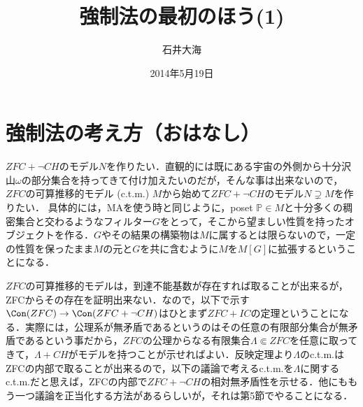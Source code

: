 \documentclass[a4j]{ltjsarticle}
\title{強制法の最初のほう(1)}
\author{石井大海}
\date{2014年5月19日}
\begin{document}
\maketitle
\section{強制法の考え方（おはなし）}
$ZFC + \neg CH$のモデル$N$を作りたい．直観的には既にある宇宙の外側から十分沢山$\omega$の部分集合を持ってきて付け加えたいのだが，そんな事は出来ないので，$ZFC$の可算推移的モデル (c.t.m.) $M$から始めて$ZFC+\neg CH$のモデル$N \supsetneq M$を作りたい．
具体的には，MAを使う時と同じように，poset $\mathbb{P} \in M$と十分多くの稠密集合と交わるようなフィルター$G$をとって，そこから望ましい性質を持ったオブジェクトを作る．$G$やその結果の構築物は$M$に属するとは限らないので，一定の性質を保ったまま$M$の元と$G$を共に含むように$M$を$M[G]$に拡張するということになる．

$ZFC$の可算推移的モデルは，到達不能基数が存在すれば取ることが出来るが，ZFCからその存在を証明出来ない．なので，以下で示す$\Con(ZFC) \rightarrow \Con(ZFC+\neg CH)$はひとまず$ZFC+IC$の定理ということになる．実際には，公理系が無矛盾であるというのはその任意の有限部分集合が無矛盾であるという事だから，$ZFC$の公理からなる有限集合$\Lambda \Subset ZFC$を任意に取ってきて，$\Lambda + CH$がモデルを持つことが示せればよい．反映定理より$\Lambda$のc.t.m.はZFCの内部で取ることが出来るので，以下の議論で考えるc.t.m.を$\Lambda$に関するc.t.m.だと思えば，ZFCの内部で$ZFC+\neg CH$の相対無矛盾性を示せる．他にももう一つ議論を正当化する方法があるらしいが，それは第5節でやることになる．
\end{document}
